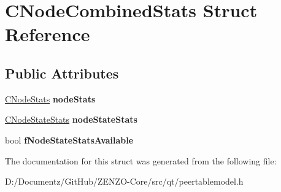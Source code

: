 \hypertarget{struct_c_node_combined_stats}{}\section{C\+Node\+Combined\+Stats Struct Reference}
\label{struct_c_node_combined_stats}
\subsection*{Public Attributes}
\begin{DoxyCompactItemize}
\item 
\mbox{\label{struct_c_node_combined_stats_ad26d590ef79b08623b2b6658b59e9a69}} 
\mbox{\hyperlink{class_c_node_stats}{C\+Node\+Stats}} {\bfseries node\+Stats}
\item 
\mbox{\label{struct_c_node_combined_stats_a6ce7320fa9ca5a3706ec4caf76ac34a1}} 
\mbox{\hyperlink{struct_c_node_state_stats}{C\+Node\+State\+Stats}} {\bfseries node\+State\+Stats}
\item 
\mbox{\label{struct_c_node_combined_stats_adc8bd9241fd1f220059b87398fa10fca}} 
bool {\bfseries f\+Node\+State\+Stats\+Available}
\end{DoxyCompactItemize}


The documentation for this struct was generated from the following file\+:\begin{DoxyCompactItemize}
\item 
D\+:/\+Documentz/\+Git\+Hub/\+Z\+E\+N\+Z\+O-\/\+Core/src/qt/peertablemodel.\+h\end{DoxyCompactItemize}
